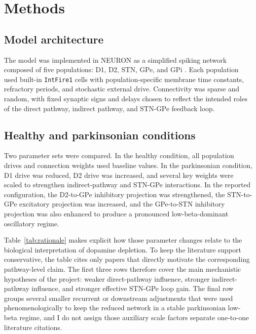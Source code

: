 \documentclass[11pt]{article}
\begin{document}
\section{Methods}

\subsection{Model architecture}
The model was implemented in NEURON as a simplified spiking network composed of five populations: D1, D2, STN, GPe, and GPi \citep{HinesCarnevale1997}. Each population used built-in \texttt{IntFire1} cells with population-specific membrane time constants, refractory periods, and stochastic external drive. Connectivity was sparse and random, with fixed synaptic signs and delays chosen to reflect the intended roles of the direct pathway, indirect pathway, and STN-GPe feedback loop.

\subsection{Healthy and parkinsonian conditions}
Two parameter sets were compared. In the healthy condition, all population drives and connection weights used baseline values. In the parkinsonian condition, D1 drive was reduced, D2 drive was increased, and several key weights were scaled to strengthen indirect-pathway and STN-GPe interactions. In the reported configuration, the D2-to-GPe inhibitory projection was strengthened, the STN-to-GPe excitatory projection was increased, and the GPe-to-STN inhibitory projection was also enhanced to produce a pronounced low-beta-dominant oscillatory regime.

Table~\ref{tab:rationale} makes explicit how those parameter changes relate to the biological interpretation of dopamine depletion. To keep the literature support conservative, the table cites only papers that directly motivate the corresponding pathway-level claim. The first three rows therefore cover the main mechanistic hypotheses of the project: weaker direct-pathway influence, stronger indirect-pathway influence, and stronger effective STN-GPe loop gain. The final row groups several smaller recurrent or downstream adjustments that were used phenomenologically to keep the reduced network in a stable parkinsonian low-beta regime, and I do not assign those auxiliary scale factors separate one-to-one literature citations.
\end{document}
